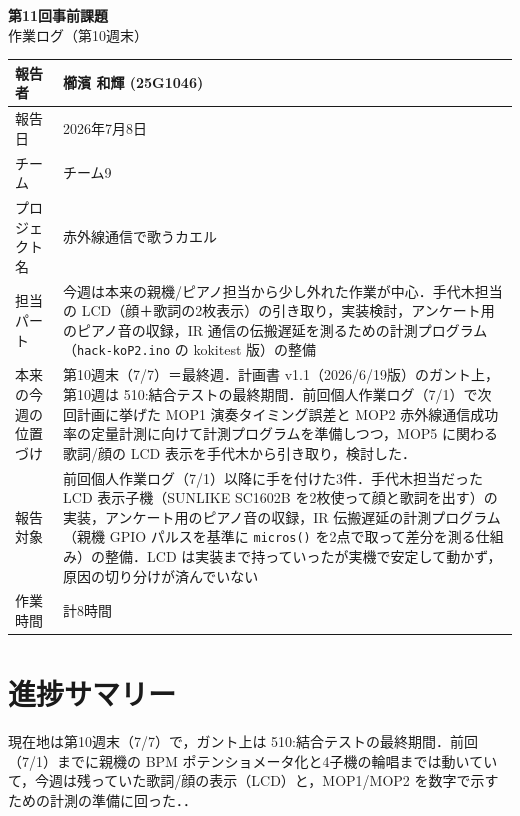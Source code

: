 \documentclass[a4paper,11pt]{ltjsarticle}
\providecommand{\％}{\%}
\begin{document}
\begin{center}
    {\LARGE \textbf{第11回事前課題}}\\[0.4em]
    {\large 作業ログ（第10週末）}\\[1em]
\end{center}

\begin{tabular}{|p{4cm}|p{10cm}|}
\hline
報告者 & 櫛濱 和輝 (25G1046)\\
\hline
報告日 & 2026年7月8日\\
\hline
チーム & チーム9\\
\hline
プロジェクト名 & 赤外線通信で歌うカエル\\
\hline
担当パート & 今週は本来の親機/ピアノ担当から少し外れた作業が中心．手代木担当の LCD（顔＋歌詞の2枚表示）の引き取り，実装検討，アンケート用のピアノ音の収録，IR 通信の伝搬遅延を測るための計測プログラム（\texttt{hack-koP2.ino} の kokitest 版）の整備\\
\hline
本来の今週の位置づけ & 第10週末（7/7）＝最終週．計画書 v1.1（2026/6/19版）のガント上，第10週は 510:結合テストの最終期間．前回個人作業ログ（7/1）で次回計画に挙げた MOP1 演奏タイミング誤差と MOP2 赤外線通信成功率の定量計測に向けて計測プログラムを準備しつつ，MOP5 に関わる歌詞/顔の LCD 表示を手代木から引き取り，検討した．\\
\hline
報告対象 & 前回個人作業ログ（7/1）以降に手を付けた3件．手代木担当だった LCD 表示子機（SUNLIKE SC1602B を2枚使って顔と歌詞を出す）の実装，アンケート用のピアノ音の収録，IR 伝搬遅延の計測プログラム（親機 GPIO パルスを基準に \texttt{micros()} を2点で取って差分を測る仕組み）の整備．LCD は実装まで持っていったが実機で安定して動かず，原因の切り分けが済んでいない\\
\hline
作業時間 & 計8時間\\
\hline
\end{tabular}

\vspace{1em}

\section{進捗サマリー}\label{sec:summary}

現在地は第10週末（7/7）で，ガント上は 510:結合テストの最終期間．前回（7/1）までに親機の BPM ポテンショメータ化と4子機の輪唱までは動いていて，今週は残っていた歌詞/顔の表示（LCD）と，MOP1/MOP2 を数字で示すための計測の準備に回った．．
\end{document}
